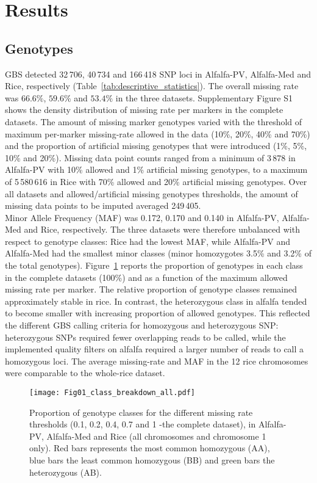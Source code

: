\section{Results}
\label{sec:results}

\subsection{Genotypes}
\label{sec:genotypes}  
GBS detected 32\,706, 40\,734 and 166\,418 SNP loci in Alfalfa-PV, Alfalfa-Med and Rice, respectively (Table~\ref{tab:descriptive_statistics}). The overall missing rate was $66.6\%$, $59.6\%$ and $53.4\%$ in the three datasets. Supplementary Figure S1 shows the density distribution of missing rate per markers in the complete datasets. The amount of missing marker genotypes varied with the threshold of maximum per-marker missing-rate allowed in the data (10\%, 20\%, 40\% and 70\%) and the proportion of artificial missing genotypes that were introduced (1\%, 5\%, 10\% and 20\%). Missing data point counts ranged from a minimum of 3\,878 in Alfalfa-PV with 10\% allowed and 1\% artificial missing genotypes, to a maximum of 5\,580\,616 in Rice with 70\% allowed and 20\% artificial missing genotypes. Over all datasets and allowed/artificial missing genotypes thresholds, the amount of missing data points to be imputed averaged 249\,405.\\
Minor Allele Frequency (MAF) was 0.172, 0.170 and 0.140 in Alfalfa-PV, Alfalfa-Med and Rice, respectively. The three datasets were therefore unbalanced with respect to genotype classes: Rice had the lowest MAF, while Alfalfa-PV and Alfalfa-Med had the smallest minor classes (minor homozygotes 3.5\% and 3.2\% of the total genotypes). Figure~\ref{fig:genotype_classes} reports the proportion of genotypes in each class in the complete datasets (100\%) and as a function of the maximum allowed missing rate per marker. The relative proportion of genotype classes remained approximately stable in rice. In contrast, the heterozygous class in alfalfa tended to become smaller with increasing proportion of allowed genotypes. This reflected the different GBS calling criteria for homozygous and heterozygous SNP: heterozygous SNPs required fewer overlapping reads to be called, while the implemented quality filters on alfalfa required a larger number of reads to call a homozygous loci. The average missing-rate and MAF in the 12 rice chromosomes were comparable to the whole-rice dataset.

\begin{figure}
\texttt{[image: Fig01\_class\_breakdown\_all.pdf]}
\caption[Proportions of genotype classes]{​Proportion of genotype classes for the different missing rate thresholds (0.1, 0.2, 0.4, 0.7 and 1 -the complete dataset), in Alfalfa-PV, Alfalfa-Med and Rice (all chromosomes and chromosome 1 only). Red bars represents the most common homozygous (AA), blue bars the least common homozygous (BB) and green bars the heterozygous (AB).}
\label{fig:genotype_classes}
\end{figure}

